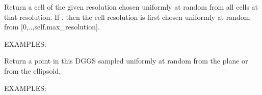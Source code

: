 \documentclass[a4paper,12ptopenany,oneside,english]{sphinxmanual}
\begin{document}
\begin{fulllineitems}

\begin{fulllineitems}
\label{\detokenize{dggs:rhealpixdggs.dggs.RHEALPixDGGS.random_cell}}
\pysigstartsignatures
{}
\pysigstopsignatures
\sphinxAtStartPar
Return a cell of the given resolution chosen uniformly at random
from all cells at that resolution.
If , then the cell resolution is first chosen
uniformly at random from {[}0,..,self.max\_resolution{]}.

\sphinxAtStartPar
EXAMPLES:

\begin{sphinxVerbatim}[commandchars=\\\{\}]
\end{sphinxVerbatim}

\end{fulllineitems}


\begin{fulllineitems}
\label{\detokenize{dggs:rhealpixdggs.dggs.RHEALPixDGGS.random_point}}
\pysigstartsignatures
{}
\pysigstopsignatures
\sphinxAtStartPar
Return a point in this DGGS sampled uniformly at
random from the plane or from the ellipsoid.

\sphinxAtStartPar
EXAMPLES:

\begin{sphinxVerbatim}[commandchars=\\\{\}]
  
\end{sphinxVerbatim}


\end{fulllineitems}
\end{fulllineitems}
\end{document}

